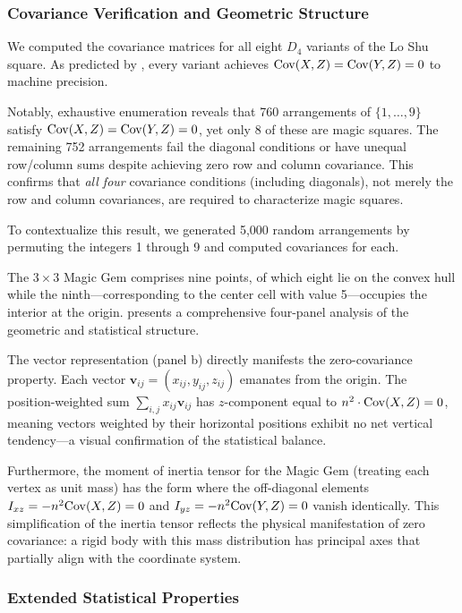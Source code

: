\subsubsection{Covariance Verification and Geometric Structure}

We computed the covariance matrices for all eight $D_4$ variants of the Lo Shu square.
As predicted by , every variant achieves
$\mathrm{Cov}(X, Z) = \mathrm{Cov}(Y, Z) = 0$ to machine precision.

Notably, exhaustive enumeration reveals that 760 arrangements of $\{1, \ldots, 9\}$ 
satisfy $\mathrm{Cov}(X, Z) = \mathrm{Cov}(Y, Z) = 0$, yet only 8 of these are magic squares.
The remaining 752 arrangements fail the diagonal conditions or have unequal row/column sums
despite achieving zero row and column covariance.
This confirms that \emph{all four} covariance conditions (including diagonals), 
not merely the row and column covariances, are required to characterize magic squares.

To contextualize this result, we generated 5,000 random arrangements 
by permuting the integers 1 through 9 and computed covariances for each.

The $3 \times 3$ Magic Gem comprises nine points, of which eight lie on the convex hull
while the ninth---corresponding to the center cell with value 5---occupies the interior at the origin.
 presents a comprehensive four-panel analysis of the geometric 
and statistical structure.

The vector representation (panel b) directly manifests the zero-covariance property.
Each vector $\mathbf{v}_{ij} = (x_{ij}, y_{ij}, z_{ij})$ emanates from the origin.
The position-weighted sum $\sum_{i,j} x_{ij} \mathbf{v}_{ij}$ has $z$-component equal to 
$n^2 \cdot \mathrm{Cov}(X,Z) = 0$, meaning vectors weighted by their horizontal positions 
exhibit no net vertical tendency---a visual confirmation of the statistical balance.

Furthermore, the moment of inertia tensor for the Magic Gem (treating each vertex as unit mass) 
has the form where the off-diagonal elements $I_{xz} = -n^2 \mathrm{Cov}(X,Z) = 0$ and $I_{yz} = -n^2 \mathrm{Cov}(Y,Z) = 0$
vanish identically. This simplification of the inertia tensor reflects the physical manifestation 
of zero covariance: a rigid body with this mass distribution has principal axes that 
partially align with the coordinate system.

\subsubsection{Extended Statistical Properties}

